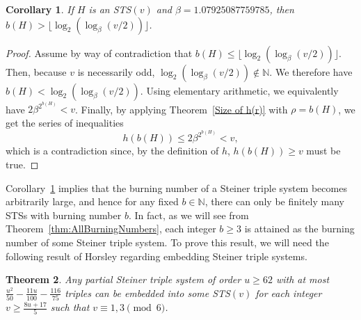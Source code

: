 \documentclass[12pt]{article}
\newtheorem{theorem}{Theorem}[section]
\newtheorem{corollary}[theorem]{Corollary}
\theoremstyle{definition}
\numberwithin{table}{section}
\begin{document}
\begin{corollary}\label{cor:lowerbound_burning_logs}
    If $H$ is an STS$(v)$ and $\beta = 1.07925087759785$, then $b(H) > \lfloor \log_2(\log_\beta(v/2))\rfloor$.      
\end{corollary}

\begin{proof}
Assume by way of contradiction that $b(H) \leq \lfloor \log_2(\log_\beta(v/2))\rfloor$. Then, because $v$ is necessarily odd, $\log_2(\log_\beta(v/2)) \notin \mathbb{N}$. 
We therefore have $b(H) <  \log_2(\log_\beta(v/2))$. Using elementary arithmetic, we equivalently have $2\beta^{2^{b(H)}}<v$. Finally, by applying Theorem~\ref{Size of h(r)} with $\rho=b(H)$, we get the series of inequalities $$h(b(H))\leq 2\beta^{2^{b(H)}}<v, $$ which is a contradiction since, by the definition of $h$, $h(b(H))\geq v$ must be true.
\end{proof}

Corollary~\ref{cor:lowerbound_burning_logs} implies that the burning number of a Steiner triple system becomes arbitrarily large, and hence
for any fixed $b\in\mathbb{N}$, there can only be finitely many STSs with burning number $b$. In fact, as we will see from Theorem~\ref{thm:AllBurningNumbers}, 
each integer $b \geq 3$ is attained as the burning number of some Steiner triple system.  
To prove this result, we will need the following result of Horsley regarding embedding Steiner triple systems.

\begin{theorem}\cite{MR3248026} \label{thm:partialSTS_smaller}
    Any partial Steiner triple system of order $u \geq 62$ with at most $\frac{u^2}{50} - \frac{11u}{100} - \frac{116}{75}$ triples can be embedded into some STS$(v)$ for each integer $v \geq  \frac{8u+17}{5}$ such that $v \equiv 1, 3 \pmod 6$.
\end{theorem}
\end{document}
